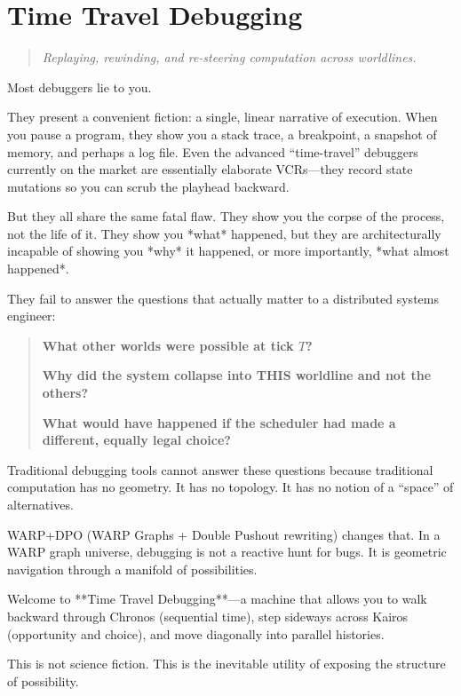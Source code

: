 \chapter{Time Travel Debugging}\label{chapter-15-time-travel-debugging}

\begin{quote}
\textit{Replaying, rewinding, and re-steering computation across worldlines.}
\end{quote}

Most debuggers lie to you.

They present a convenient fiction: a single, linear narrative of execution. When you pause a program, they show you a stack trace, a breakpoint, a snapshot of memory, and perhaps a log file. Even the advanced ``time-travel'' debuggers currently on the market are essentially elaborate VCRs—they record state mutations so you can scrub the playhead backward.

But they all share the same fatal flaw. They show you the corpse of the process, not the life of it. They show you *what* happened, but they are architecturally incapable of showing you *why* it happened, or more importantly, *what almost happened*.

They fail to answer the questions that actually matter to a distributed systems engineer:

\begin{quote}
\textbf{What other worlds were possible at tick $T$?}

\textbf{Why did the system collapse into THIS worldline and not the others?}

\textbf{What would have happened if the scheduler had made a different, equally legal choice?}
\end{quote}

Traditional debugging tools cannot answer these questions because traditional computation has no geometry. It has no topology. It has no notion of a ``space'' of alternatives.

WARP+DPO (WARP Graphs + Double Pushout rewriting) changes that. In a WARP graph universe, debugging is not a reactive hunt for bugs. It is geometric navigation through a manifold of possibilities.

Welcome to **Time Travel Debugging**—a machine that allows you to walk backward through Chronos (sequential time), step sideways across Kairos (opportunity and choice), and move diagonally into parallel histories.

This is not science fiction. This is the inevitable utility of exposing the structure of possibility.

